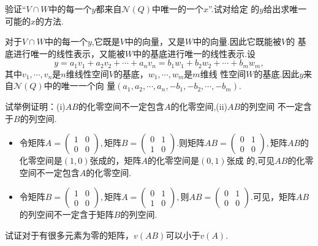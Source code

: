 ﻿\documentclass{book} \usepackage{exsheets} \usepackage{xeCJK}
\begin{document}
\begin{question}
  验证“$V\cap
  W$中的每一个$y$都来自$\mathcal{N}(Q)$中唯一的一个$x$”.试对给定
  的$y$给出求唯一可能的$x$的方法.
\end{question}
\begin{solution}
  对于$V\cap
  W$中的每一个$y$,它既是$V$中的向量，又是$W$中的向量.因此它既能被$V$的
  基底进行唯一的线性表示，又能被$W$中的基底进行唯一的线性表示.设
$$
y=a_1v_1+a_2v_2+\cdots+a_nv_n=b_1w_1+b_2w_2+\cdots+b_mw_m,
$$
其中$v_1,\cdots,v_n$是$n$维线性空间$V$的基底，$w_1,\cdots,w_m$是$m$维线
性空间$W$的基底.因此$y$来自$\mathcal{N}(Q)$中的唯一一个向
量$(a_1,a_2,\cdots,a_n,-b_1,-b_2,\cdots,-b_m)$.
\end{solution}
\begin{question}
  试举例证明：(i)$AB$的化零空间不一定包含$A$的化零空间,(ii)$AB$的列空间
  不一定含于$B$的列空间.
\end{question}
\begin{solution}
  \begin{itemize}
  \item 令矩阵$A=
    \begin{pmatrix}
      1&0\\
      0&0
    \end{pmatrix}, $矩阵$B=
    \begin{pmatrix}
      0&1\\
      1&0
    \end{pmatrix}.  $则矩阵$AB=
    \begin{pmatrix}
      0&1\\
      0&0
    \end{pmatrix},
    $矩阵$AB$的化零空间是$(1,0)$张成的，矩阵$A$的化零空间是$(0,1)$张成
    的,可见$AB$的化零空间不一定包含$A$的化零空间.
  \item 令矩阵$B=
    \begin{pmatrix}
      1&0\\
      0&0
    \end{pmatrix}, $矩阵$A=
    \begin{pmatrix}
      0&1\\
      1&0
    \end{pmatrix}, $则$AB=
    \begin{pmatrix}
      0&1\\
      0&0
    \end{pmatrix}.  $可见，矩阵$AB$的列空间不一定含于矩阵$B$的列空间.
  \end{itemize}
\end{solution}
\begin{question}
  试证对于有很多元素为零的矩阵，$v(AB)$可以小于$v(A)$.
\end{question}
\end{document}
